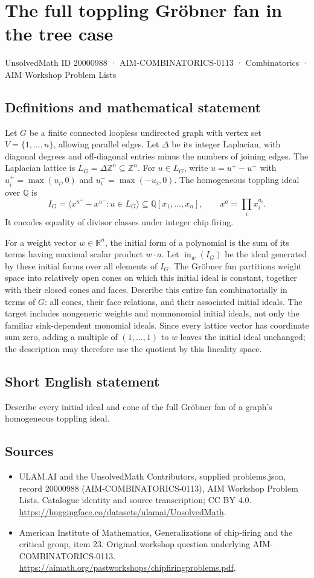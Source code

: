 \documentclass[11pt,a4paper]{article}
\begin{document}
\section*{The full toppling Gröbner fan in the tree case}\label{20000988}
{\small UnsolvedMath ID 20000988 · AIM-COMBINATORICS-0113 · Combinatorics · AIM Workshop Problem Lists}
\subsection{Definitions and mathematical statement}
Let $G$ be a finite connected loopless undirected graph with vertex set $V=\{1,\ldots,n\}$, allowing parallel edges.
Let $\Delta$ be its integer Laplacian, with diagonal degrees and off-diagonal entries minus the numbers of joining edges.
The Laplacian lattice is $L_G=\Delta\mathbb Z^n\subseteq\mathbb Z^n$.
For $u\in L_G$, write $u=u^+-u^-$ with $u_i^+=\max(u_i,0)$ and $u_i^-=\max(-u_i,0)$.
The homogeneous toppling ideal over $\mathbb Q$ is
\[
 I_G=\langle x^{u^+}-x^{u^-}:u\in L_G\rangle
       \subseteq\mathbb Q[x_1,\ldots,x_n],
 \qquad x^a=\prod_i x_i^{a_i}.
\]
It encodes equality of divisor classes under integer chip firing.

For a weight vector $w\in\mathbb R^n$, the initial form of a polynomial is the sum of its terms having maximal scalar product $w\cdot a$.
Let $\operatorname{in}_w(I_G)$ be the ideal generated by these initial forms over all elements of $I_G$.
The Gröbner fan partitions weight space into relatively open cones on which this initial ideal is constant, together with their closed cones and faces.
Describe this entire fan combinatorially in terms of $G$: all cones, their face relations, and their associated initial ideals.
The target includes nongeneric weights and nonmonomial initial ideals, not only the familiar sink-dependent monomial ideals.
Since every lattice vector has coordinate sum zero, adding a multiple of $(1,\ldots,1)$ to $w$ leaves the initial ideal unchanged; the description may therefore use the quotient by this lineality space.
\subsection{Short English statement}
Describe every initial ideal and cone of the full Gröbner fan of a graph’s homogeneous toppling ideal.
\subsection{Sources}
\begin{itemize}
\item[S1] ULAM.AI and the UnsolvedMath Contributors, supplied problems.json, record 20000988 (AIM-COMBINATORICS-0113), AIM Workshop Problem Lists. Catalogue identity and source transcription; CC BY 4.0.
\url{https://huggingface.co/datasets/ulamai/UnsolvedMath}.
\item[S2] American Institute of Mathematics, Generalizations of chip-firing and the critical group, item 23. Original workshop question underlying AIM-COMBINATORICS-0113.
\url{https://aimath.org/pastworkshops/chipfiringproblems.pdf}.
\end{itemize}
\end{document}
